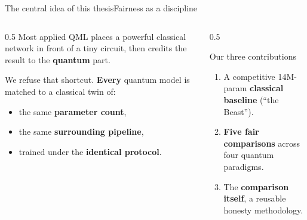 \begin{frame}{The central idea of this thesis}{Fairness as a discipline}
    \begin{columns}[T]
        \begin{column}{0.5\textwidth}
            Most applied QML places a powerful classical network in front of a tiny
            circuit, then credits the result to the \textbf{quantum} part.

            \vspace{6pt}
            We refuse that shortcut. \textbf{Every} quantum model is matched to a
            classical twin of:
            \begin{itemize}
                \item the same \textbf{parameter count},
                \item the same \textbf{surrounding pipeline},
                \item trained under the \textbf{identical protocol}.
            \end{itemize}
        \end{column}
        \begin{column}{0.5\textwidth}
            \vspace{0.6em}
            \begin{block}{Our three contributions}
                \begin{enumerate}
                    \item A competitive 14M-param \textbf{classical baseline} (``the Beast'').
                    \item \textbf{Five fair comparisons} across four quantum paradigms.
                    \item The \textbf{comparison itself}, a reusable honesty methodology.
                \end{enumerate}
            \end{block}
        \end{column}
    \end{columns}
\end{frame}
